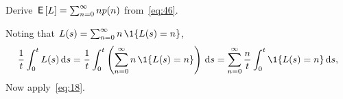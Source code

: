 \begin{exercise}\label{ex:l-111}
 Derive $\,\mathsf{E}\left[L\right] = \sum_{n=0}^\infty n p(n)$ from~\cref{eq:46}. 
\begin{solution}
Noting that %
$L(s) = \sum_{n=0}^\infty n\, \1{\L(s) = n}$,
\begin{equation*}
\frac 1 t \int_0^t L(s) \d s = \frac 1 t \int_0^t \left(\sum_{n=0}^{\infty} n\, \1{\L(s) = n}\right) \d s
= \sum_{n=0}^{\infty} \frac n t \int_0^t \1{\L(s) = n} \d s,
\end{equation*}
Now apply~\cref{eq:18}.
\end{solution}
\end{exercise}







